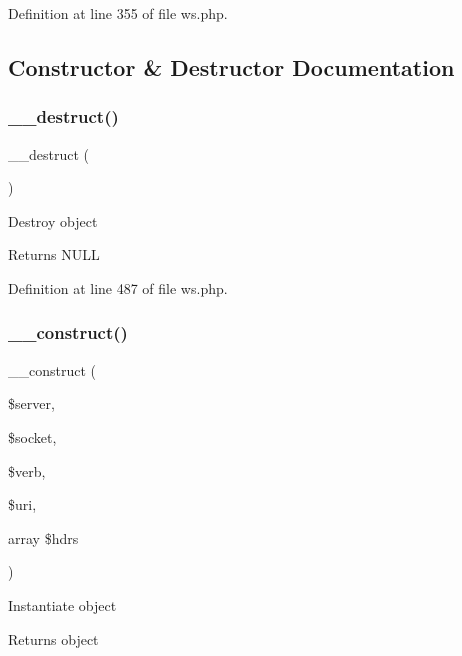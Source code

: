 Definition at line 355 of file ws.\+php.



\subsection{Constructor \& Destructor Documentation}
\hypertarget{class_c_l_i_1_1_agent_a421831a265621325e1fdd19aace0c758}{}\label{class_c_l_i_1_1_agent_a421831a265621325e1fdd19aace0c758} 
\subsubsection{\texorpdfstring{\+\_\+\+\_\+destruct()}{\_\_destruct()}}
{\footnotesize\ttfamily \+\_\+\+\_\+destruct (\begin{DoxyParamCaption}{ }\end{DoxyParamCaption})}

Destroy object \begin{DoxyReturn}{Returns}
N\+U\+LL 
\end{DoxyReturn}


Definition at line 487 of file ws.\+php.

\hypertarget{class_c_l_i_1_1_agent_adc71118d74293287e2c19e556cbb8bf9}{}\label{class_c_l_i_1_1_agent_adc71118d74293287e2c19e556cbb8bf9} 
\subsubsection{\texorpdfstring{\+\_\+\+\_\+construct()}{\_\_construct()}}
{\footnotesize\ttfamily \+\_\+\+\_\+construct (\begin{DoxyParamCaption}\item[{}]{\$server,  }\item[{}]{\$socket,  }\item[{}]{\$verb,  }\item[{}]{\$uri,  }\item[{array}]{\$hdrs }\end{DoxyParamCaption})}

Instantiate object \begin{DoxyReturn}{Returns}
object 
\end{DoxyReturn}

